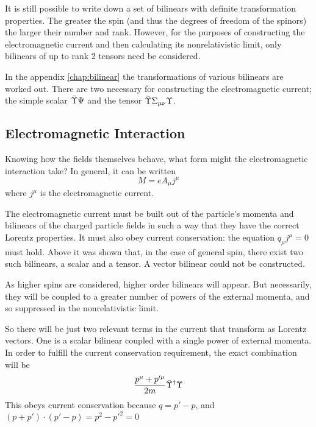 It is still possible to write down a set of bilinears with definite transformation properties.  The greater the spin (and thus the degrees of freedom of the spinors) the larger their number and rank.  However, for the purposes of constructing the electromagnetic current and then calculating its nonrelativistic limit, only bilinears of up to rank 2 tensors need be considered.

In the appendix \ref{chap:bilinear} the transformations of various bilinears are worked out.  There are two necessary for constructing the electromagnetic current; the simple scalar $\bar{\Upsilon} \Psi$ and the tensor $\bar{\Upsilon} \Sigma_{\mu\nu} \Upsilon$.
 

%



\subsection{Electromagnetic Interaction}
Knowing how the fields themselves behave, what form might the electromagnetic interaction take?  In general, it can be written
\[
	M = e A_\mu j^\mu 
\]
where $j^\mu$ is the electromagnetic current.


The electromagnetic current must be built out of the particle's momenta and bilinears of the charged particle fields in such a way that they have the correct Lorentz properties.  It must also obey current conservation: the equation $q_\mu j^\mu = 0$ must hold.  Above it was shown that, in the case of general spin, there exist two such bilinears, a scalar and a tensor.  A vector bilinear could not be constructed.

As higher spins are considered, higher order bilinears will appear.  But necessarily, they will be coupled to a greater number of powers of the external momenta, and so suppressed in the nonrelativistic limit.

So there will be just two relevant terms in the current that transform as Lorentz vectors.  One is a scalar bilinear coupled with a single power of external momenta.  In order to fulfill the current conservation requirement, the exact combination will be
\[
	\frac{p^\mu + p'^\mu}{2m} \bar{\Upsilon}^\dagger \Upsilon
\]
This obeys current conservation because $q = p' -p$, and $ (p+p')\cdot(p'-p) = p^2-p'^2=0$

